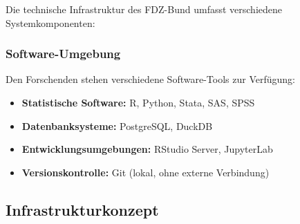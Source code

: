 \documentclass[
  ngerman,
  10pt,
  twocolumn]{article}
\providecommand{\tightlist}{%
  \setlength{\itemsep}{0pt}\setlength{\parskip}{0pt}}
\let\origtable\table
\let\endorigtable\endtable
\renewenvironment{table}[1][htbp]{%
  \origtable*[#1]%
}{%
  \endorigtable*%
}
\begin{document}
Die technische Infrastruktur des FDZ-Bund umfasst verschiedene
Systemkomponenten:

\begin{table}

\caption{\label{tbl-fdz-infrastructure}Technische Ausstattung des
FDZ-Bund (beispielhafte Konfiguration)}


\end{table}%

\subsubsection{Software-Umgebung}\label{software-umgebung}

Den Forschenden stehen verschiedene Software-Tools zur Verfügung:

\begin{itemize}
\tightlist
\item
  \textbf{Statistische Software:} R, Python, Stata, SAS, SPSS
\item
  \textbf{Datenbanksysteme:} PostgreSQL, DuckDB
\item
  \textbf{Entwicklungsumgebungen:} RStudio Server, JupyterLab
\item
  \textbf{Versionskontrolle:} Git (lokal, ohne externe Verbindung)
\end{itemize}

\subsection{Infrastrukturkonzept}\label{infrastrukturkonzept}
\end{document}
